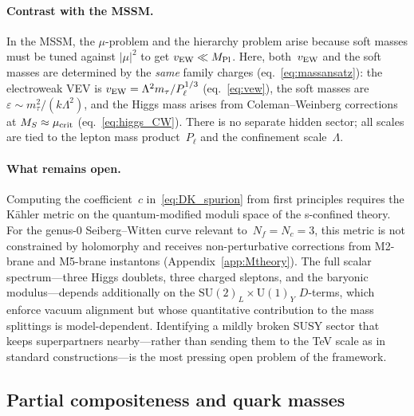 \documentclass[12pt,a4paper]{article}
\newcommand{\SU}{\mathrm{SU}}
\newcommand{\UU}{\mathrm{U}}
\newcommand{\Nf}{N_f}
\newcommand{\Nc}{N_c}
\begin{document}
\paragraph{Contrast with the MSSM.}
In the MSSM, the $\mu$-problem and the hierarchy problem arise because
soft masses must be tuned against $|\mu|^2$ to get $v_{\rm EW} \ll
M_{\rm Pl}$.  Here, both~$v_{\rm EW}$ and the soft masses are
determined by the \emph{same} family charges (eq.~\ref{eq:massansatz}):
the electroweak VEV is $v_{\rm EW} = \Lambda^2 m_\tau/P_\ell^{1/3}$
(eq.~\ref{eq:vew}), the soft masses are $\varepsilon \sim m_\tau^2/
(k\Lambda^2)$, and the Higgs mass arises from Coleman--Weinberg
corrections at $M_S \approx \mu_{\rm crit}$ (eq.~\ref{eq:higgs_CW}).
There is no separate hidden sector; all scales are tied to the lepton
mass product~$P_\ell$ and the confinement scale~$\Lambda$.

\paragraph{What remains open.}
Computing the coefficient~$c$ in~\eqref{eq:DK_spurion} from first
principles requires the K\"ahler metric on the quantum-modified moduli
space of the s-confined theory.  For the genus-0 Seiberg--Witten curve
relevant to~$\Nf = \Nc = 3$, this metric is not constrained by
holomorphy and receives non-perturbative corrections from M2-brane and
M5-brane instantons (Appendix~\ref{app:Mtheory}).  The full scalar
spectrum---three Higgs doublets, three charged sleptons, and the
baryonic modulus---depends additionally on the $\SU(2)_L \times
\UU(1)_Y$ $D$-terms, which enforce vacuum alignment but whose
quantitative contribution to the mass splittings is model-dependent.
Identifying a mildly broken SUSY sector that keeps superpartners
nearby---rather than sending them to the TeV scale as in standard
constructions---is the most pressing open problem of the framework.

\subsection{Partial compositeness and quark masses}
\end{document}
